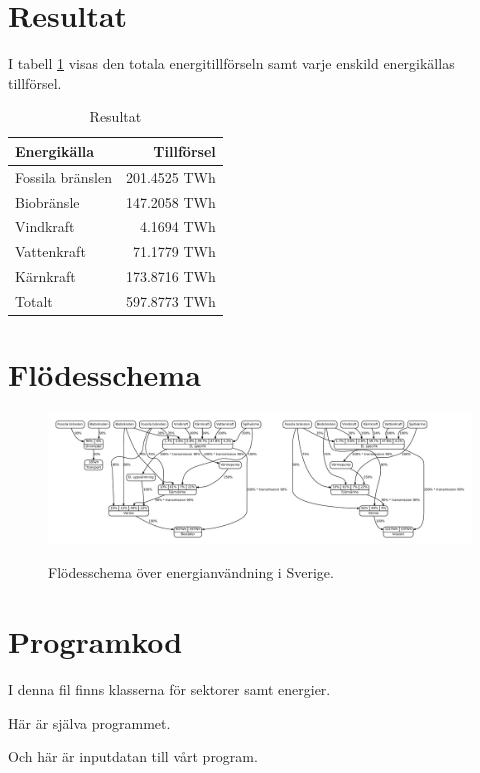 \documentclass[a4paper,11pt,fleqn, titlepage]{article}
\begin{document}
\section{Resultat}

I tabell \ref{resultat} visas den totala energitillförseln samt varje
enskild energikällas tillförsel.
\begin{table}[h!]
	\centering
	\begin{tabular}{| l | r |}
		\hline
		Energikälla      & Tillförsel \\ \hline
		Fossila bränslen & 201.4525 TWh \\
		Biobränsle       & 147.2058 TWh \\
		Vindkraft        &   4.1694 TWh \\
		Vattenkraft      &  71.1779 TWh \\
		Kärnkraft        & 173.8716 TWh \\ \hline
		Totalt           & 597.8773 TWh \\ \hline
	\end{tabular}
	\caption{Resultat}
	\label{resultat}
\end{table}


\newpage
\appendix

\section{Flödesschema}
\begin{figure}[h!]
	\centering 
	\vspace*{0cm}
	\includegraphics[width=0.6\paperheight,angle=270]{diagram.pdf}
	\label{app:schema}
	\caption{Flödesschema över energianvändning i Sverige.}
\end{figure}

\newpage

\section{Programkod}
I denna fil finns klasserna för sektorer samt energier.


\newpage
Här är själva programmet.


\newpage
Och här är inputdatan till vårt program.

\end{document}
